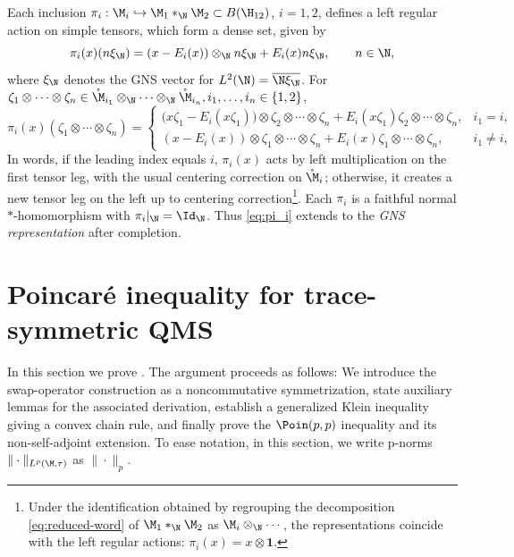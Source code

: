 \documentclass[sn-mathphys-num]{sn-jnl}
\begin{document}
Each inclusion $\pi_i:\M_i\hookrightarrow \M_1*_{\N}\M_2\subset B(\H_{12})$, $i=1,2$,
defines a left regular action on simple tensors, which form a dense set, given by \cite[Lemma 4.7.3]{brown_-algebras_2008}
\[
\pi_i(x)(n\xi_\N)=(x-E_i(x))\otimes_\N n\xi_\N+E_i(x)n\xi_\N,\qquad n\in\N,
\]
where $\xi_\N$ denotes the GNS vector for $L^2(\N)=\overline{\N \xi_\N}$. For $\zeta_1\otimes\cdots\otimes\zeta_n \in \mathring{\M}_{i_1}\otimes_{\N}\cdots\otimes_{\N}\mathring{\M}_{i_n}, i_1,\dots,i_n\in\{1,2\}$,
\begin{equation}\label{eq:action}
\pi_i(x)(\zeta_1\otimes\cdots\otimes\zeta_n)
  =
  \begin{cases}
    \bigl(x \zeta_1-E_i(x\zeta_1)\bigr)\otimes\zeta_2\otimes\cdots\otimes\zeta_n
    +E_i(x  \zeta_1)  \zeta_2\otimes\cdots\otimes\zeta_n,
    & i_1=i,\\
    (x-E_i(x))\otimes  \zeta_1\otimes\cdots\otimes\zeta_n+E_i(x)\zeta_1\otimes\cdots\otimes\zeta_n,
    & i_1\neq i,
  \end{cases}
\end{equation}
In words, if the leading index equals $i$, $\pi_i(x)$ acts by left multiplication on the first tensor leg, with the usual centering correction on $\mathring{\M}_i$; otherwise, it creates a new tensor leg on the left up to centering correction\footnote{Under the identification obtained by regrouping the decomposition
\eqref{eq:reduced-word} of
$\M_1 *_\N \M_2$ as $\M_i\otimes_\N \cdots$, the representations coincide with the left regular actions:
$\pi_i(x) = x \otimes \mathbf{1}$.}.
Each $\pi_i$ is a faithful normal $*$-homomorphism with $\pi_i|_{\N}=\Id_{\N}$. Thus \cref{eq:pi_i} extends to the \emph{GNS representation} after completion.
\section{Poincar\'e inequality for trace-symmetric QMS}\label{sec:ppp-tracial}
In this section we prove .
The argument proceeds as follows:
We introduce the swap-operator construction as a noncommutative symmetrization,
state auxiliary lemmas for the associated derivation,
establish a generalized Klein inequality giving a convex chain rule,
and finally prove the $\Poin(p,p)$ inequality and its non-self-adjoint extension. To ease notation, in this section, we write p-norms $\|\cdot\|_{L^p(\M,\tau)}$ as $\|\cdot\|_p$.
\end{document}
